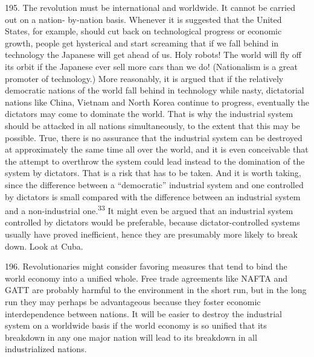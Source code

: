 \documentclass{article}
\begin{document}
195.  The revolution must be international and worldwide.  It cannot be carried out on a nation-
by-nation basis.  Whenever it is suggested that the United States, for example, should cut back on 
technological progress or economic growth, people get hysterical and start screaming that if we 
fall behind in technology the Japanese will get ahead of us.  Holy robots! The world will fly off its 
orbit  if  the  Japanese  ever  sell  more  cars  than  we  do!  (Nationalism  is  a  great  promoter  of  
technology.) More reasonably, it is argued that if the relatively democratic nations of the world 
fall  behind  in  technology  while  nasty,  dictatorial  nations  like  China,  Vietnam  and  North  Korea  
continue to progress, eventually the dictators may come to dominate the world.  That is why the 
industrial system should be attacked in all nations simultaneously, to the extent that this may be 
possible.  True, there is no assurance that the industrial system can be destroyed at approximately 
the  same  time  all  over  the  world,  and  it  is  even  conceivable  that  the  attempt  to  overthrow  the  
system could lead instead to the domination of the system by dictators.  That is a risk that has to 
be taken.  And it is worth taking, since the difference between a “democratic” industrial system 
and one controlled by dictators is small compared with the difference between an industrial system 
and a non-industrial one.\textsuperscript{33} It might even be argued that an industrial system controlled by dictators 
would be preferable, because dictator-controlled  systems usually have proved inefficient, hence 
they are presumably more likely to break down.  Look at Cuba. \vspace{\baselineskip}

196.  Revolutionaries might consider favoring measures that tend to bind the world economy into 
a  unified  whole.   Free  trade  agreements  like  NAFTA  and  GATT  are  probably  harmful  to  the  
environment in the short run, but in the long run they may perhaps be advantageous because they 
foster economic interdependence between nations.  It will be easier to destroy the industrial system 
on a worldwide basis if the world economy is so unified that its breakdown in any one major nation 
will lead to its breakdown in all industrialized nations. \vspace{\baselineskip}
\end{document}
